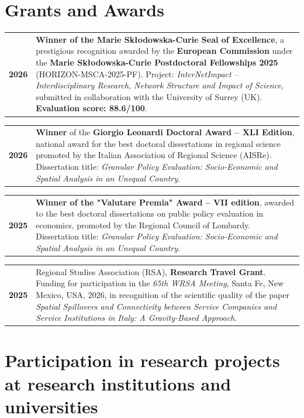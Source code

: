 \documentclass[11pt,a4paper,sans]{moderncv} %
\newcommand{\cvitemcols}[3]{%
  \begin{tabular}{p{#1}p{\dimexpr\linewidth-#1\relax}}
    \textbf{#2} & #3
  \end{tabular}\par\vspace{6pt}
}
\begin{document}
\section{\textbf{Grants and Awards}}



\cvitemcols{2cm}{2026}{
\textbf{Winner of the Marie Skłodowska-Curie Seal of Excellence},
a prestigious recognition awarded by the
\textbf{European Commission} under the
\textbf{Marie Skłodowska-Curie Postdoctoral Fellowships 2025}
(HORIZON-MSCA-2025-PF).
Project: \textit{InterNetImpact -- Interdisciplinary Research,
Network Structure and Impact of Science},
submitted in collaboration with the University of Surrey (UK).
\textbf{Evaluation score: 88.6/100}.
}



\cvitemcols{2cm}{2026}{\textbf{Winner} of the \textbf{Giorgio Leonardi Doctoral Award -- XLI Edition}, national award for the best doctoral dissertations in regional science promoted by the Italian Association of Regional Science (AISRe). Dissertation title: \textit{Granular Policy Evaluation: Socio-Economic and Spatial Analysis in an Unequal Country}.}


\cvitemcols{2cm}{2025}{\textbf{Winner of the "Valutare Premia" Award -- VII edition}, awarded to the best doctoral dissertations on public policy evaluation in economics, promoted by the Regional Council of Lombardy. Dissertation title: \textit{Granular Policy Evaluation: Socio-Economic and Spatial Analysis in an Unequal Country}.}

\cvitemcols{2cm}{2025}{Regional Studies Association (RSA), \textbf{Research Travel Grant}.
Funding for participation in the \textit{65th WRSA Meeting}, Santa Fe, New Mexico, USA, 2026, in recognition of the scientific quality of the paper \textit{Spatial Spillovers and Connectivity between Service Companies and Service Institutions in Italy: A Gravity-Based Approach}.}









\section{\textbf{Participation in research projects at research institutions and universities}}
\end{document}

